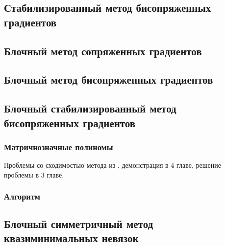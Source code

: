 \cite{Saad2003}
\subsection{Стабилизированный метод бисопряженных градиентов}
\cite{doi:10.1137/0913035}
\subsection{Блочный метод сопряженных градиентов}
\cite{OLEARY1980293}
\subsection{Блочный метод бисопряженных градиентов}
\cite{OLEARY1980293}
\subsection{Блочный стабилизированный метод бисопряженных градиентов}
\cite{elGuennouni2003}
\subsubsection{Матричнозначные полиномы}
 \par Проблемы со сходимостью метода из \cite{elGuennouni2003}, демонстрация в 4 главе, решение проблемы в 3 главе.
 \subsubsection{Алгоритм}
 \subsection{Блочный симметричный метод квазиминимальных невязок}


\newpage
